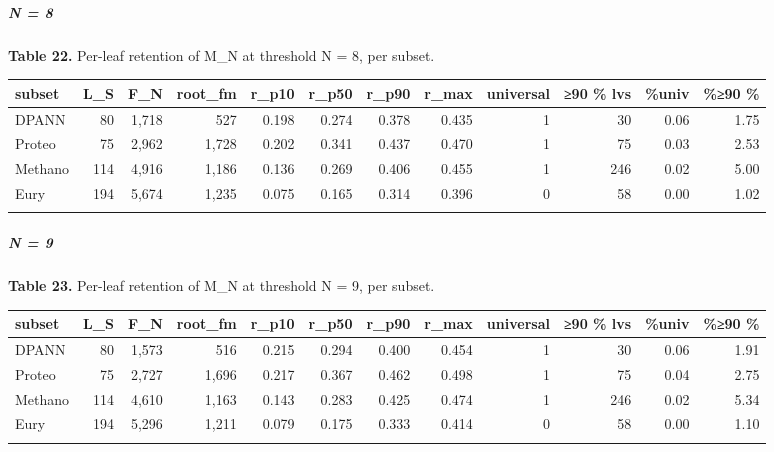 \documentclass[
  10pt,
]{article}
\begin{document}
\subparagraph{N = 8}\label{n--8}

\textbf{Table 22.} Per-leaf retention of M\_N at threshold N = 8, per
subset.

\begin{center}
\begin{adjustbox}{max width=\textwidth}
\begin{tabular}{@{}lrrrrrrrrrrr@{}}
\toprule\noalign{}
subset & L\_S & F\_N & root\_fm & r\_p10 & r\_p50 & r\_p90 & r\_max &
universal & ≥90 \% lvs & \%univ & \%≥90 \% \\
\midrule\noalign{}
DPANN & 80 & 1,718 & 527 & 0.198 & 0.274 & 0.378 & 0.435 & 1 & 30 & 0.06
& 1.75 \\
Proteo & 75 & 2,962 & 1,728 & 0.202 & 0.341 & 0.437 & 0.470 & 1 & 75 &
0.03 & 2.53 \\
Methano & 114 & 4,916 & 1,186 & 0.136 & 0.269 & 0.406 & 0.455 & 1 & 246
& 0.02 & 5.00 \\
Eury & 194 & 5,674 & 1,235 & 0.075 & 0.165 & 0.314 & 0.396 & 0 & 58 &
0.00 & 1.02 \\
\bottomrule\noalign{}
\end{tabular}
\end{adjustbox}
\end{center}

\subparagraph{N = 9}\label{n--9}

\textbf{Table 23.} Per-leaf retention of M\_N at threshold N = 9, per
subset.

\begin{center}
\begin{adjustbox}{max width=\textwidth}
\begin{tabular}{@{}lrrrrrrrrrrr@{}}
\toprule\noalign{}
subset & L\_S & F\_N & root\_fm & r\_p10 & r\_p50 & r\_p90 & r\_max &
universal & ≥90 \% lvs & \%univ & \%≥90 \% \\
\midrule\noalign{}
DPANN & 80 & 1,573 & 516 & 0.215 & 0.294 & 0.400 & 0.454 & 1 & 30 & 0.06
& 1.91 \\
Proteo & 75 & 2,727 & 1,696 & 0.217 & 0.367 & 0.462 & 0.498 & 1 & 75 &
0.04 & 2.75 \\
Methano & 114 & 4,610 & 1,163 & 0.143 & 0.283 & 0.425 & 0.474 & 1 & 246
& 0.02 & 5.34 \\
Eury & 194 & 5,296 & 1,211 & 0.079 & 0.175 & 0.333 & 0.414 & 0 & 58 &
0.00 & 1.10 \\
\bottomrule\noalign{}
\end{tabular}
\end{adjustbox}
\end{center}
\end{document}
